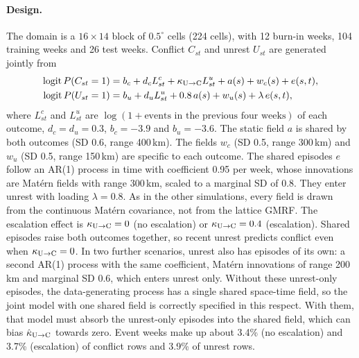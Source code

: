 \paragraph{Design.} The domain is a $16 \times 14$ block of $0.5^\circ$ cells (224
cells), with 12 burn-in weeks, 104 training weeks and 26 test weeks. Conflict
$C_{st}$ and unrest $U_{st}$ are generated jointly from
\begin{align*}
\operatorname{logit} P(C_{st} = 1) &= b_c + d_c L^c_{st} + \kappa_{\mathrm{U}\to\mathrm{C}}  L^u_{st} + a(s) + w_c(s) + e(s,t),\\
\operatorname{logit} P(U_{st} = 1) &= b_u + d_u L^u_{st} + 0.8\,a(s) + w_u(s) + \lambda\, e(s,t),
\end{align*}
where $L^c_{st}$ and $L^u_{st}$ are $\log(1 + \text{events in the previous four
weeks})$ of each outcome, $d_c = d_u = 0.3$, $b_c = -3.9$ and $b_u = -3.6$. The static
field $a$ is shared by both outcomes (SD 0.6, range 400\,km). The fields $w_c$ (SD 0.5,
range 300\,km) and $w_u$ (SD 0.5, range 150\,km) are specific to each outcome. The
shared episodes $e$ follow an AR(1) process in time with coefficient 0.95 per week,
whose innovations are Mat\'ern fields with range 300\,km, scaled to a marginal SD of
0.8. They enter unrest with loading $\lambda = 0.8$. As in the other simulations, every
field is drawn from the continuous Mat\'ern covariance, not from the lattice GMRF.
The escalation effect is $\kappa_{\mathrm{U}\to\mathrm{C}}  = 0$ (no escalation) or $\kappa_{\mathrm{U}\to\mathrm{C}}  = 0.4$ (escalation).
Shared episodes raise both outcomes together, so recent unrest predicts conflict even
when $\kappa_{\mathrm{U}\to\mathrm{C}}  = 0$. In two further scenarios, unrest also has episodes of its own:
a second AR(1) process with the same coefficient, Mat\'ern innovations of range
200\,km and marginal SD 0.6, which enters unrest only. Without these unrest-only
episodes, the data-generating process has a single shared space-time field, so the
joint model with one shared field is correctly specified in this respect. With them,
that model must absorb the unrest-only episodes into the shared field, which can bias
$\hat\kappa_{\mathrm{U}\to\mathrm{C}}$ towards zero. Event weeks make up about 3.4\% (no escalation) and 3.7\%
(escalation) of conflict rows and 3.9\% of unrest rows.

